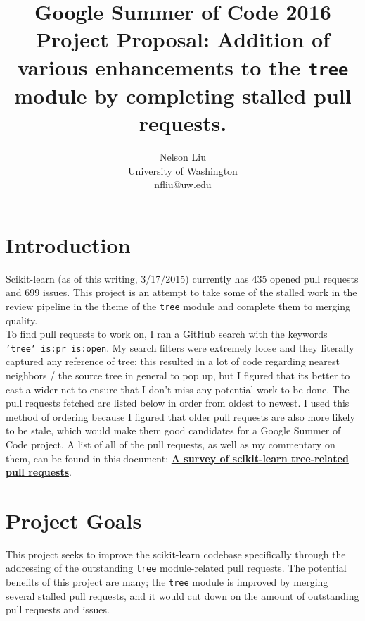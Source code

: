 \documentclass[12pt, oneside]{article}
\title{Google Summer of Code 2016
  Project Proposal: Addition of various enhancements to the
  \texttt{tree} module by completing stalled pull requests.}
\author{Nelson Liu \\
  University of Washington \\
  nfliu@uw.edu }
\begin{document}
\maketitle
\section{Introduction}
Scikit-learn (as of this writing, 3/17/2015) currently has 435 opened
pull requests and 699 issues. This project is an attempt to take some
of the stalled work in the review pipeline in the theme of the
\texttt{tree} module and complete them to merging quality.\\
To find pull requests to work on, I ran a GitHub search with the
keywords \texttt{'tree' is:pr is:open}. My search filters were
extremely loose and they literally captured any reference of tree;
this resulted in a lot of code regarding nearest neighbors / the
source tree in general to pop up, but I figured that its better to
cast a wider net to ensure that I don't miss any potential work to be
done. The pull requests fetched are listed below in order from oldest
to newest. I used this method of ordering because I figured that older
pull requests are also more likely to be stale, which would make them
good candidates for a Google Summer of Code project. A list of all of
the pull requests, as well as my commentary on them, can be found in
this document: \textbf{\href{http://nelsonliu.me/files/tree-pr-notes.pdf}{A survey of scikit-learn tree-related
    pull requests}}.


\section{Project Goals}
This project seeks to improve the scikit-learn codebase specifically
through the addressing of the outstanding \texttt{tree} module-related
pull requests. The potential benefits of this project are many; the
\texttt{tree} module is improved by merging several stalled pull
requests, and it would cut down on the amount of outstanding pull
requests and issues.
\end{document}
